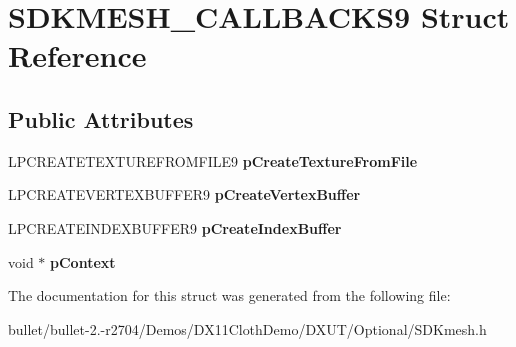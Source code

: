 \hypertarget{struct_s_d_k_m_e_s_h___c_a_l_l_b_a_c_k_s9}{\section{S\+D\+K\+M\+E\+S\+H\+\_\+\+C\+A\+L\+L\+B\+A\+C\+K\+S9 Struct Reference}
\label{struct_s_d_k_m_e_s_h___c_a_l_l_b_a_c_k_s9}
}
\subsection*{Public Attributes}
\begin{DoxyCompactItemize}
\item 
\hypertarget{struct_s_d_k_m_e_s_h___c_a_l_l_b_a_c_k_s9_a8d221d098d27d44c43e481a3c7438be0}{L\+P\+C\+R\+E\+A\+T\+E\+T\+E\+X\+T\+U\+R\+E\+F\+R\+O\+M\+F\+I\+L\+E9 {\bfseries p\+Create\+Texture\+From\+File}}\label{struct_s_d_k_m_e_s_h___c_a_l_l_b_a_c_k_s9_a8d221d098d27d44c43e481a3c7438be0}

\item 
\hypertarget{struct_s_d_k_m_e_s_h___c_a_l_l_b_a_c_k_s9_aee0ddab80530d2aa6767e57ffb28593c}{L\+P\+C\+R\+E\+A\+T\+E\+V\+E\+R\+T\+E\+X\+B\+U\+F\+F\+E\+R9 {\bfseries p\+Create\+Vertex\+Buffer}}\label{struct_s_d_k_m_e_s_h___c_a_l_l_b_a_c_k_s9_aee0ddab80530d2aa6767e57ffb28593c}

\item 
\hypertarget{struct_s_d_k_m_e_s_h___c_a_l_l_b_a_c_k_s9_a97a0a2de2fa2c3c9cf8bfe06b284eb8e}{L\+P\+C\+R\+E\+A\+T\+E\+I\+N\+D\+E\+X\+B\+U\+F\+F\+E\+R9 {\bfseries p\+Create\+Index\+Buffer}}\label{struct_s_d_k_m_e_s_h___c_a_l_l_b_a_c_k_s9_a97a0a2de2fa2c3c9cf8bfe06b284eb8e}

\item 
\hypertarget{struct_s_d_k_m_e_s_h___c_a_l_l_b_a_c_k_s9_ab250647eafedea913f739462e86f29a6}{void $\ast$ {\bfseries p\+Context}}\label{struct_s_d_k_m_e_s_h___c_a_l_l_b_a_c_k_s9_ab250647eafedea913f739462e86f29a6}

\end{DoxyCompactItemize}


The documentation for this struct was generated from the following file\+:\begin{DoxyCompactItemize}
\item 
bullet/bullet-\/2.-\/r2704/\+Demos/\+D\+X11\+Cloth\+Demo/\+D\+X\+U\+T/\+Optional/S\+D\+Kmesh.\+h\end{DoxyCompactItemize}
